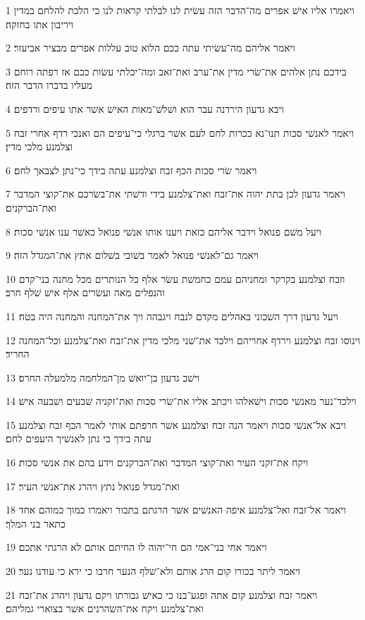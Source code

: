 \par 1 ויאמרו אליו אישׁ אפרים מה־הדבר הזה עשׂית לנו לבלתי קראות לנו כי הלכת להלחם במדין ויריבון אתו בחזקה׃
\par 2 ויאמר אליהם מה־עשׂיתי עתה ככם הלוא טוב עללות אפרים מבציר אביעזר׃
\par 3 בידכם נתן אלהים את־שׂרי מדין את־ערב ואת־זאב ומה־יכלתי עשׂות ככם אז רפתה רוחם מעליו בדברו הדבר הזה׃
\par 4 ויבא גדעון הירדנה עבר הוא ושׁלשׁ־מאות האישׁ אשׁר אתו עיפים ורדפים׃
\par 5 ויאמר לאנשׁי סכות תנו־נא ככרות לחם לעם אשׁר ברגלי כי־עיפים הם ואנכי רדף אחרי זבח וצלמנע מלכי מדין׃
\par 6 ויאמר שׂרי סכות הכף זבח וצלמנע עתה בידך כי־נתן לצבאך לחם׃
\par 7 ויאמר גדעון לכן בתת יהוה את־זבח ואת־צלמנע בידי ודשׁתי את־בשׂרכם את־קוצי המדבר ואת־הברקנים׃
\par 8 ויעל משׁם פנואל וידבר אליהם כזאת ויענו אותו אנשׁי פנואל כאשׁר ענו אנשׁי סכות׃
\par 9 ויאמר גם־לאנשׁי פנואל לאמר בשׁובי בשׁלום אתץ את־המגדל הזה׃
\par 10 וזבח וצלמנע בקרקר ומחניהם עמם כחמשׁת עשׂר אלף כל הנותרים מכל מחנה בני־קדם והנפלים מאה ועשׂרים אלף אישׁ שׁלף חרב׃
\par 11 ויעל גדעון דרך השׁכוני באהלים מקדם לנבח ויגבהה ויך את־המחנה והמחנה היה בטח׃
\par 12 וינוסו זבח וצלמנע וירדף אחריהם וילכד את־שׁני מלכי מדין את־זבח ואת־צלמנע וכל־המחנה החריד׃
\par 13 וישׁב גדעון בן־יואשׁ מן־המלחמה מלמעלה החרס׃
\par 14 וילכד־נער מאנשׁי סכות וישׁאלהו ויכתב אליו את־שׂרי סכות ואת־זקניה שׁבעים ושׁבעה אישׁ׃
\par 15 ויבא אל־אנשׁי סכות ויאמר הנה זבח וצלמנע אשׁר חרפתם אותי לאמר הכף זבח וצלמנע עתה בידך כי נתן לאנשׁיך היעפים לחם׃
\par 16 ויקח את־זקני העיר ואת־קוצי המדבר ואת־הברקנים וידע בהם את אנשׁי סכות׃
\par 17 ואת־מגדל פנואל נתץ ויהרג את־אנשׁי העיר׃
\par 18 ויאמר אל־זבח ואל־צלמנע איפה האנשׁים אשׁר הרגתם בתבור ויאמרו כמוך כמוהם אחד כתאר בני המלך׃
\par 19 ויאמר אחי בני־אמי הם חי־יהוה לו החיתם אותם לא הרגתי אתכם׃
\par 20 ויאמר ליתר בכורו קום הרג אותם ולא־שׁלף הנער חרבו כי ירא כי עודנו נער׃
\par 21 ויאמר זבח וצלמנע קום אתה ופגע־בנו כי כאישׁ גבורתו ויקם גדעון ויהרג את־זבח ואת־צלמנע ויקח את־השׂהרנים אשׁר בצוארי גמליהם׃
